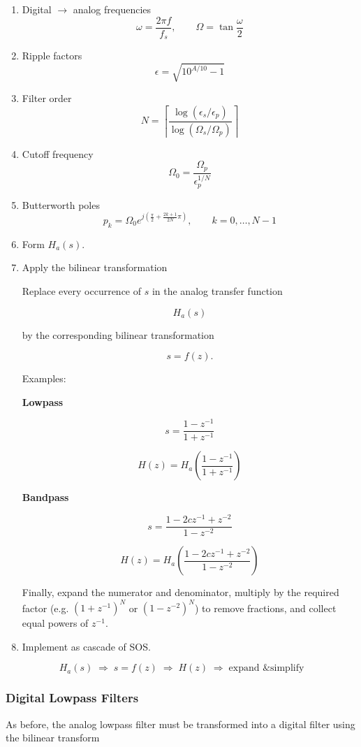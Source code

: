 \begin{enumerate}
\item Digital $\rightarrow$ analog frequencies
\[
\omega=\frac{2\pi f}{f_s},
\qquad
\Omega=\tan\frac{\omega}{2}
\]

\item Ripple factors
\[
\epsilon=\sqrt{10^{A/10}-1}
\]

\item Filter order
\[
N=
\left\lceil
\frac{
\log\left(\epsilon_s/\epsilon_p\right)}
{\log\left(\Omega_s/\Omega_p\right)}
\right\rceil
\]

\item Cutoff frequency
\[
\Omega_0
=
\frac{\Omega_p}
{\epsilon_p^{1/N}}
\]

\item Butterworth poles
\[
p_k
=
\Omega_0
e^{j\left(\frac{\pi}{2}+\frac{2k+1}{2N}\pi\right)},
\qquad
k=0,\ldots,N-1
\]

\item Form $H_a(s)$.

\item Apply the bilinear transformation

Replace every occurrence of $s$ in the analog transfer function

\[
H_a(s)
\]

by the corresponding bilinear transformation

\[
s=f(z).
\]

Examples:

\textbf{Lowpass}

\[
s=\frac{1-z^{-1}}{1+z^{-1}}
\]

\[
H(z)
=
H_a\!\left(
\frac{1-z^{-1}}
{1+z^{-1}}
\right)
\]

\textbf{Bandpass}

\[
s=
\frac{1-2cz^{-1}+z^{-2}}
{1-z^{-2}}
\]

\[
H(z)
=
H_a\!\left(
\frac{1-2cz^{-1}+z^{-2}}
{1-z^{-2}}
\right)
\]

Finally, expand the numerator and denominator, multiply by the required
factor (e.g. $(1+z^{-1})^N$ or $(1-z^{-2})^N$) to remove fractions, and
collect equal powers of $z^{-1}$.

\item Implement as cascade of SOS.
\end{enumerate}

\[
\boxed{
H_a(s)
\;\Longrightarrow\;
s=f(z)
\;\Longrightarrow\;
H(z)
\;\Longrightarrow\;
\text{expand \& simplify}
}
\]

\subsubsection{Digital Lowpass Filters}
As before, the analog lowpass filter must be transformed into a digital
filter using the bilinear transform

